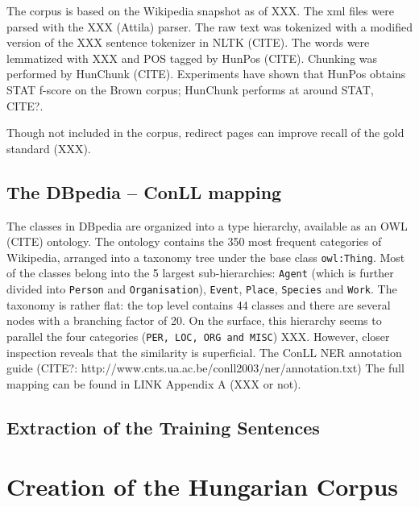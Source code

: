 \documentclass[11pt]{article}
\begin{document}
The corpus is based on the Wikipedia snapshot as of XXX. The xml files were parsed with the XXX (Attila) parser. The raw text was tokenized with a modified version of the XXX sentence tokenizer in NLTK (CITE). The words were lemmatized with XXX and POS tagged by HunPos (CITE). Chunking was performed by HunChunk (CITE). Experiments have shown that HunPos obtains STAT f-score on the Brown corpus; HunChunk performs at around STAT, CITE?.

Though not included in the corpus, redirect pages can improve recall of the gold standard (XXX). 

\subsection{The DBpedia -- ConLL mapping}


The classes in DBpedia are organized into a type hierarchy, available as an OWL (CITE) ontology. The ontology contains the 350 most frequent categories of Wikipedia, arranged into a taxonomy tree under the base class \texttt{owl:Thing}. Most of the classes belong into the 5 largest sub-hierarchies: \texttt{Agent} (which is further divided into \texttt{Person} and \texttt{Organisation}), \texttt{Event}, \texttt{Place}, \texttt{Species} and \texttt{Work}. The taxonomy is rather flat: the top level contains 44 classes and there are several nodes with a branching factor of 20.
On the surface, this hierarchy seems to parallel the four categories (\texttt{PER, LOC, ORG and MISC}) XXX. However, closer inspection reveals that the similarity is superficial. The ConLL NER annotation guide (CITE?: http://www.cnts.ua.ac.be/conll2003/ner/annotation.txt)
The full mapping can be found in LINK Appendix A (XXX or not).

\subsection{Extraction of the Training Sentences}


\section{Creation of the Hungarian Corpus}
\end{document}
